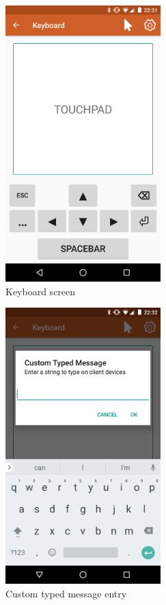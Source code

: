 \documentclass{sig-alternate}
\renewcommand\_{\textunderscore\allowbreak}  %
\begin{document}
\begin{figure}[ht]
	\hypertarget{fig:keyboard}{}
	\centering
	\caption{Keyboard screen}
	\includegraphics[width=6cm]{screenshots/keyboard}
\end{figure}

\begin{figure}[ht]
	\hypertarget{fig:custom\_type\_message}{}
	\centering
	\caption{Custom typed message entry}
	\includegraphics[width=6cm]{screenshots/custom_type_message}
\end{figure}
\end{document}
